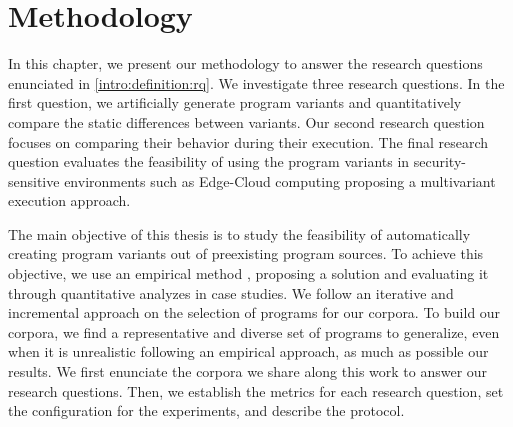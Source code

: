 \chapter{Methodology} 
\label{chapter:method}

\pagestyle{plain}
\newcommand{\libsodiumfunctions}{869}
\newcommand{\qrcodefunctions}{1849}
\newcommand{\allmewefunctions}{\libsodiumfunctions + \qrcodefunctions}

\newcommand{\py}[1]{}
\newcommand{\fromjson}[2]{}

\newcommand{\corpusrosetta}{\fromjson{data/crow_corpus.json}{.[0].name}}
\newcommand{\corpussodium}{Libsodium\xspace}
\newcommand{\corpusqrcode}{QrCode\xspace}


\newcommand{\DTWStatic}{dt\_static\xspace}
\newcommand{\DTW}{dt\_dyn\xspace}
\newcommand{\tool}{CROW\xspace}


In this chapter, we present our methodology to answer the research questions enunciated in \autoref{intro:definition:rq}.
We investigate three research questions. In the first question, we artificially generate \wasm program variants and quantitatively compare the static differences between variants. 
Our second research question focuses on comparing their behavior during their execution.
The final research question evaluates the feasibility of using the program variants in security-sensitive environments such as Edge-Cloud computing proposing a multivariant execution approach.

The main objective of this thesis is to study the feasibility of automatically creating program variants out of preexisting program sources. To achieve this objective,
we use an empirical method \cite{Runeson2020}, proposing a solution and evaluating it through quantitative analyzes in case studies. We follow an iterative and incremental approach on the selection of programs for our corpora. To build our corpora, we find a representative and diverse set of programs to generalize, even when it is unrealistic following an empirical approach, as much as possible our results.
We first enunciate the corpora we share along this work to answer our research questions. Then, we establish the metrics for each research question, set the configuration for the experiments, and describe the protocol.

